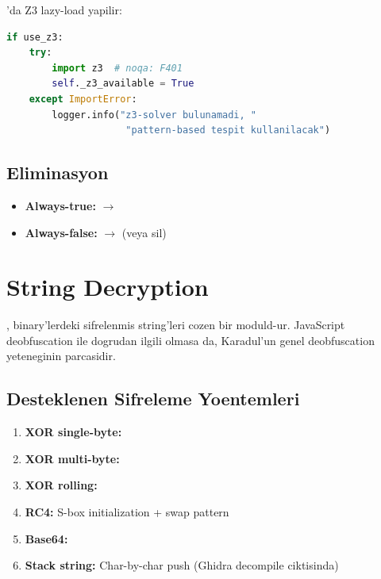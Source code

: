 'da Z3 lazy-load yapilir:

\begin{lstlisting}[language=Python, caption={Z3 lazy-load -- opaque\_predicate.py}]
if use_z3:
    try:
        import z3  # noqa: F401
        self._z3_available = True
    except ImportError:
        logger.info("z3-solver bulunamadi, "
                     "pattern-based tespit kullanilacak")
\end{lstlisting}

\subsection{Eliminasyon}

\begin{itemize}
\item \textbf{Always-true:}  $\to$ 
\item \textbf{Always-false:}  $\to$  (veya sil)
\end{itemize}


\section{String Decryption}
\label{sec:string-decrypt}

, binary'lerdeki sifrelenmis string'leri cozen bir moduld-ur. JavaScript deobfuscation ile dogrudan ilgili olmasa da, Karadul'un genel deobfuscation yeteneginin parcasidir.

\subsection{Desteklenen Sifreleme Yoentemleri}

\begin{enumerate}
\item \textbf{XOR single-byte:} 
\item \textbf{XOR multi-byte:} 
\item \textbf{XOR rolling:} 
\item \textbf{RC4:} S-box initialization + swap pattern
\item \textbf{Base64:} 
\item \textbf{Stack string:} Char-by-char push (Ghidra decompile ciktisinda)
\end{enumerate}

